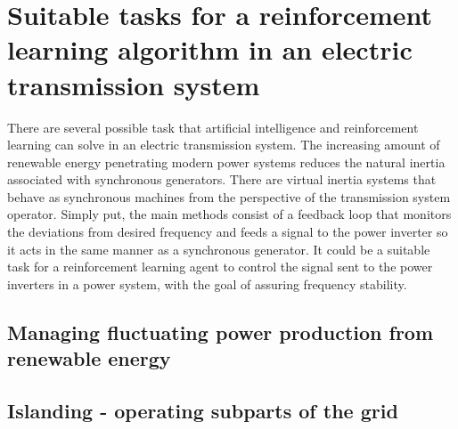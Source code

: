 \documentclass[class=book, crop=false]{standalone}
\begin{document}
\section{Suitable tasks for a reinforcement learning algorithm in an electric transmission system}
There are several possible task that artificial intelligence and reinforcement learning can solve in an electric transmission system. The increasing amount of renewable energy penetrating modern power systems reduces the natural inertia associated with synchronous generators. There are virtual inertia systems that behave as synchronous machines from the perspective of the transmission system operator\cite{virtual_inertia}. Simply put, the main methods consist of a feedback loop that monitors the deviations from desired frequency and feeds a signal to the power inverter so it acts in the same manner as a synchronous generator. It could be a suitable task for a reinforcement learning agent to control the signal sent to the power inverters in a power system, with the goal of assuring frequency stability.



\subsection{Managing fluctuating power production from renewable energy}

\subsection{Islanding - operating subparts of the grid}
\end{document}

